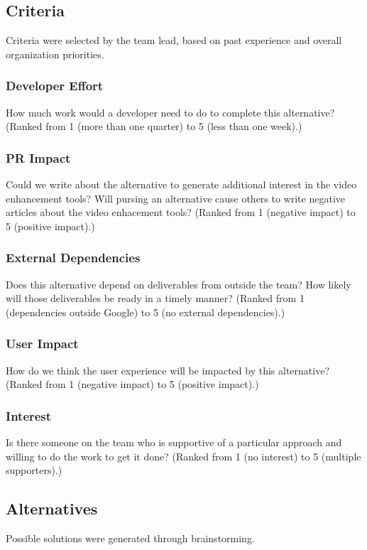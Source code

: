 \documentclass[se,resubmit]{uw-wkrpt}
\begin{document}
\subsection {Criteria}
Criteria were selected by the team lead, based on past experience and
overall organization priorities.

\subsubsection{Developer Effort}
How much work would a developer need to do to complete this alternative?
(Ranked from 1 (more than one quarter) to 5 (less than one week).)

\subsubsection{PR Impact}
Could we write about the alternative to generate additional interest in the
video enhancement tools? Will pursing an alternative cause others to write
negative articles about the video enhacement tools? (Ranked from 1
(negative impact) to 5 (positive impact).)

\subsubsection{External Dependencies}
Does this alternative depend on deliverables from outside the team? How
likely will those deliverables be ready in a timely manner? (Ranked from
1 (dependencies outside Google) to 5 (no external dependencies).)

\subsubsection{User Impact}
How do we think the user experience will be impacted by this alternative?
(Ranked from 1 (negative impact) to 5 (positive impact).)

\subsubsection{Interest}
Is there someone on the team who is supportive of a particular approach and
willing to do the work to get it done?
(Ranked from 1 (no interest) to 5 (multiple supporters).)

\subsection{Alternatives}
Possible solutions were generated through brainstorming.
\end{document}
